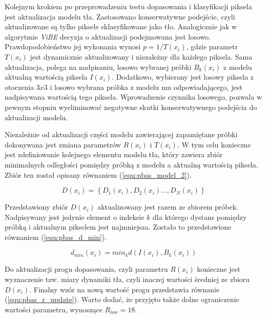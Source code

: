 Kolejnym krokiem po przeprowadzeniu testu dopasowania i klasyfikacji piksela jest aktualizacja modelu tła. 
Zastosowano konserwatywne podejście, czyli aktualizowane są tylko piksele sklasyfikowane jako tło. 
Analogicznie jak w algorytmie \textit{ViBE} decyzja o aktualizacji podejmowana jest losowo. 
Prawdopodobieństwo jej wykonania wynosi $p = 1/T(x_i)$, gdzie parametr $T(x_i)$ jest dynamicznie aktualizowany i niezależny dla każdego piksela. Sama aktualizacja, polega na nadpisaniu, losowo wybranej próbki $B_k(x_i)$ z modelu aktualną wartością piksela $I(x_i)$. Dodatkowo, wybierany jest losowy piksela z otoczenia $3x3$ i losowo wybrana próbka z modelu mu odpowiadającego, jest nadpisywana wartością tego piksela. Wprowadzenie czynnika losowego, pozwala w pewnym stopniu wyeliminować negatywne skutki konserwatywnego podejścia do aktualizacji modelu.

Niezależnie od aktualizacji części modelu zawierającej zapamiętane próbki dokonywana jest zmiana parametrów $R(x_i)$ i $T(x_i)$. 
W tym celu konieczne jest zdefiniowanie kolejnego elementu modelu tła, który zawiera zbiór minimalnych odległości pomiędzy próbką z modelu a aktualną wartością piksela. 
Zbiór ten został opisany równaniem (\ref{equ:pbas_model_2}). 
 
	\begin{equation}
		D(x_i)= \left\{ D_1(x_i), D_2(x_i) \dotsc, D_N(x_i) \right\}
	\label{equ:pbas_model_2}	
	\end{equation}

Przedstawiony zbiór $D(x_i)$ aktualizowany jest razem ze zbiorem próbek. 
Nadpisywany jest jedynie element o indeksie $k$ dla którego dystans pomiędzy próbką i aktualnym pikselem jest najmniejsza. 
Zostało to przedstawione równaniem (\ref{equ:pbas_d_min}).
	
	\begin{equation}
		d_{min}(x_i) = min_k d(I(x_i), B_k(x_i))
	\label{equ:pbas_d_min}	
	\end{equation}

Do aktualizacji progu dopasowania, czyli parametru $R(x_i)$ konieczne jest wyznaczenie tzw. miary dynamiki tła, czyli inaczej wartości średniej ze zbioru $D(x_i)$. 
Finalny wzór na nową wartość progu przedstawia równanie (\ref{equ:pbas_r_update}). 
Warto dodać, że przyjęto także dolne ograniczenie wartości parametru, wynoszące $R_{low} = 18$.
    
